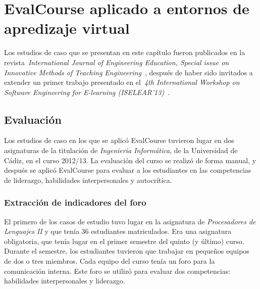 

\section{EvalCourse aplicado a entornos de apredizaje virtual}

Los estudios de caso que se presentan en este capítulo fueron publicados en la revista~\emph{International Journal of Engineering Education, Special issue on Innovative Methods of Teaching Engineering}~\cite{Balderas:2015}, después de haber sido invitados a extender un primer trabajo presentado en el~\emph{4th International Workshop on Software Engineering for E-learning (ISELEAR’13)}~\cite{balderas2013generative}.

\subsection{Evaluación}

Los estudios de caso en los que se aplicó EvalCourse tuvieron lugar en dos asignaturas de la titulación de \emph{Ingenieria Informática}, de la Universidad de Cádiz, en el curso 2012/13. La evaluación del curso se realizó de forma manual, y después se aplicó EvalCourse para evaluar a los estudiantes en las competencias de liderazgo, habilidades interpersonales y autocrítica.

\subsubsection{Extracción de indicadores del foro}

El primero de los casos de estudio tuvo lugar en la asignatura de \emph{Procesadores de Lenguajes II} y que tenía 36 estudiantes matriculados. Era una asignatura obligatoria, que tenía lugar en el primer semestre del quinto (y último) curso. Durante el semestre, los estudiantes tuvieron que trabajar en pequeños equipos de dos o tres miembros. Cada equipo del curso tenía un foro para la comunicación interna. Este foro se utilizó para evaluar dos competencias: habilidades interpersonales y liderazgo.

